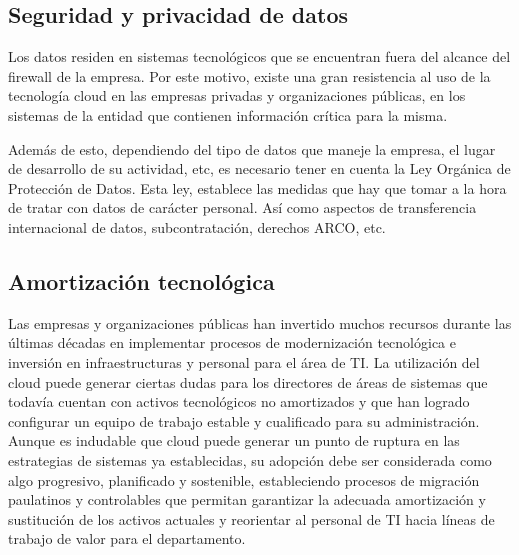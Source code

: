 \documentclass[a4paper, 12pt]{report}
\begin{document}
\subsection{Seguridad y privacidad de datos}
\begin{justify}
Los datos residen en sistemas tecnol\'ogicos que se encuentran fuera del alcance del firewall de la empresa. Por este motivo, existe una gran resistencia al uso de la tecnolog\'ia cloud en las empresas privadas y organizaciones p\'ublicas, en los sistemas de la entidad que contienen informaci\'on cr\'itica para la misma.

Adem\'as de esto, dependiendo del tipo de datos que maneje la empresa, el lugar de desarrollo de su actividad, etc, es necesario tener en cuenta la Ley Org\'anica de Protecci\'on de Datos. Esta ley, establece las medidas que hay que tomar a la hora de tratar con datos de car\'acter personal. As\'i como aspectos de transferencia internacional de datos, subcontrataci\'on, derechos ARCO, etc.
\end{justify}
\newpage
\subsection{Amortizaci\'on tecnol\'ogica}
\begin{justify}
Las empresas y organizaciones p\'ublicas han invertido muchos recursos durante las \'ultimas d\'ecadas en implementar procesos de modernizaci\'on tecnol\'ogica e inversi\'on en infraestructuras y personal para el \'area de TI. La utilizaci\'on del cloud puede generar ciertas dudas para los directores de \'areas de sistemas que todav\'ia cuentan con activos tecnol\'ogicos no amortizados y que han logrado configurar un equipo de trabajo estable y cualificado para su administraci\'on. Aunque es indudable que cloud puede generar un punto de ruptura en las estrategias de sistemas ya establecidas, su adopci\'on debe ser considerada como algo progresivo, planificado y sostenible, estableciendo procesos de migraci\'on paulatinos y controlables que permitan garantizar la adecuada amortizaci\'on y sustituci\'on de los activos actuales y reorientar al personal de TI hacia l\'ineas de trabajo de valor para el departamento.
\end{justify}
\vspace*{5em}
\end{document}
